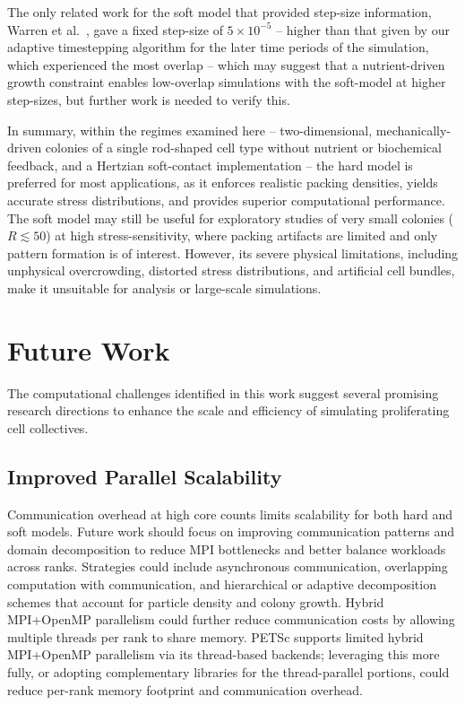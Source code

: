 \documentclass[a4paper,fleqn]{cas-dc}
\begin{document}
The only related work for the soft model that provided step-size information, Warren et al.~\cite{Warren2019}, gave a fixed step-size of $5 \times 10^{-5}$ -- higher than that given by our adaptive timestepping algorithm for the later time periods of the simulation, which experienced the most overlap -- which may suggest that a nutrient-driven growth constraint enables low-overlap simulations with the soft-model at higher step-sizes, but further work is needed to verify this.

In summary, within the regimes examined here -- two-dimensional, mechanically-driven colonies of a single rod-shaped cell type without nutrient or biochemical feedback, and a Hertzian soft-contact implementation -- the hard model is preferred for most applications, as it enforces realistic packing densities, yields accurate stress distributions, and provides superior computational performance. The soft model may still be useful for exploratory studies of very small colonies ($R \lesssim 50$) at high stress-sensitivity, where packing artifacts are limited and only pattern formation is of interest. However, its severe physical limitations, including unphysical overcrowding, distorted stress distributions, and artificial cell bundles, make it unsuitable for analysis or large-scale simulations.

\section{Future Work}

The computational challenges identified in this work suggest several promising research directions to enhance the scale and efficiency of simulating proliferating cell collectives.

\subsection{Improved Parallel Scalability}

Communication overhead at high core counts limits scalability for both hard and soft models. Future work should focus on improving communication patterns and domain decomposition to reduce MPI bottlenecks and better balance workloads across ranks. Strategies could include asynchronous communication, overlapping computation with communication, and hierarchical or adaptive decomposition schemes that account for particle density and colony growth. Hybrid MPI+OpenMP parallelism could further reduce communication costs by allowing multiple threads per rank to share memory. PETSc supports limited hybrid MPI+OpenMP parallelism via its thread-based backends; leveraging this more fully, or adopting complementary libraries for the thread-parallel portions, could reduce per-rank memory footprint and communication overhead.
\end{document}
